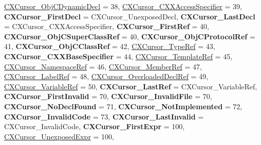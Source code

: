 \begin{DoxyCompactItemize}
\hyperlink{group__CINDEX_ggaaccc432245b4cd9f2d470913f9ef0013aa4e9883af9df6a1526455e9a9ad5bc96}{C\+X\+Cursor\+\_\+\+Obj\+C\+Dynamic\+Decl} = 38, 
\hyperlink{group__CINDEX_ggaaccc432245b4cd9f2d470913f9ef0013a25a689b655871aec95dc68f1506b6833}{C\+X\+Cursor\+\_\+\+C\+X\+X\+Access\+Specifier} = 39, 
{\bfseries C\+X\+Cursor\+\_\+\+First\+Decl} = C\+X\+Cursor\+\_\+\+Unexposed\+Decl, 
\newline
{\bfseries C\+X\+Cursor\+\_\+\+Last\+Decl} = C\+X\+Cursor\+\_\+\+C\+X\+X\+Access\+Specifier, 
{\bfseries C\+X\+Cursor\+\_\+\+First\+Ref} = 40, 
{\bfseries C\+X\+Cursor\+\_\+\+Obj\+C\+Super\+Class\+Ref} = 40, 
{\bfseries C\+X\+Cursor\+\_\+\+Obj\+C\+Protocol\+Ref} = 41, 
\newline
{\bfseries C\+X\+Cursor\+\_\+\+Obj\+C\+Class\+Ref} = 42, 
\hyperlink{group__CINDEX_ggaaccc432245b4cd9f2d470913f9ef0013a8ac2a9bf8b26022033c2eeb1f303d308}{C\+X\+Cursor\+\_\+\+Type\+Ref} = 43, 
{\bfseries C\+X\+Cursor\+\_\+\+C\+X\+X\+Base\+Specifier} = 44, 
\hyperlink{group__CINDEX_ggaaccc432245b4cd9f2d470913f9ef0013aa175ea592545f4203927db3ecf9930b5}{C\+X\+Cursor\+\_\+\+Template\+Ref} = 45, 
\newline
\hyperlink{group__CINDEX_ggaaccc432245b4cd9f2d470913f9ef0013a8d7a69f91345139c2d48d078448d1d9a}{C\+X\+Cursor\+\_\+\+Namespace\+Ref} = 46, 
\hyperlink{group__CINDEX_ggaaccc432245b4cd9f2d470913f9ef0013ad4ef54b32cb900dfe32c4f582bf3cd61}{C\+X\+Cursor\+\_\+\+Member\+Ref} = 47, 
\hyperlink{group__CINDEX_ggaaccc432245b4cd9f2d470913f9ef0013a2b9b4f16f40168caa64cfe2fc5555584}{C\+X\+Cursor\+\_\+\+Label\+Ref} = 48, 
\hyperlink{group__CINDEX_ggaaccc432245b4cd9f2d470913f9ef0013adac756905dfd01f29f10732ec475e5df}{C\+X\+Cursor\+\_\+\+Overloaded\+Decl\+Ref} = 49, 
\newline
\hyperlink{group__CINDEX_ggaaccc432245b4cd9f2d470913f9ef0013a486b3ed7778e45331bbc3d32a62ee0da}{C\+X\+Cursor\+\_\+\+Variable\+Ref} = 50, 
{\bfseries C\+X\+Cursor\+\_\+\+Last\+Ref} = C\+X\+Cursor\+\_\+\+Variable\+Ref, 
{\bfseries C\+X\+Cursor\+\_\+\+First\+Invalid} = 70, 
{\bfseries C\+X\+Cursor\+\_\+\+Invalid\+File} = 70, 
\newline
{\bfseries C\+X\+Cursor\+\_\+\+No\+Decl\+Found} = 71, 
{\bfseries C\+X\+Cursor\+\_\+\+Not\+Implemented} = 72, 
{\bfseries C\+X\+Cursor\+\_\+\+Invalid\+Code} = 73, 
{\bfseries C\+X\+Cursor\+\_\+\+Last\+Invalid} = C\+X\+Cursor\+\_\+\+Invalid\+Code, 
\newline
{\bfseries C\+X\+Cursor\+\_\+\+First\+Expr} = 100, 
\hyperlink{group__CINDEX_ggaaccc432245b4cd9f2d470913f9ef0013aa4cd2c9319493a279d14815173e528a6}{C\+X\+Cursor\+\_\+\+Unexposed\+Expr} = 100, 

\end{DoxyCompactItemize}

